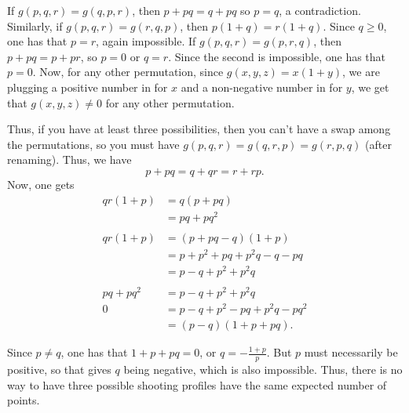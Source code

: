 \documentclass[11pt]{article}
\theoremstyle{definition}
\begin{document}
If $g(p, q, r) = g(q, p, r)$, then $p + pq = q + pq$ so $p = q$, a contradiction.  Similarly, if $g(p, q, r) = g(r, q, p)$, then $p(1+q) = r(1+q)$.  Since $q \geq 0$, one has that $p = r$, again impossible.  If $g(p, q, r) = g(p, r, q)$, then $p + pq = p + pr$, so $p = 0$ or $q=r$.  Since the second is impossible, one has that $p = 0$.  Now, for any other permutation, since $g(x, y, z) = x(1+y)$, we are plugging a positive number in for $x$ and a non-negative number in for $y$, we get that $g(x, y, z) \neq 0$ for any other permutation.

Thus, if you have at least three possibilities, then you can't have a swap among the permutations, so you must have $g(p, q, r) = g(q, r, p) = g(r, p, q)$ (after renaming).  Thus, we have $$p + pq = q+ qr = r + rp.$$  Now, one gets
\begin{align*}
qr(1+p) & = q(p+pq) \\
& = pq + pq^2 \\
& \\
qr(1+p) & = (p + pq - q)(1+p) \\
& = p + p^2 + pq + p^2q - q -pq \\
& = p - q + p^2 + p^2q \\
& \\
pq + pq^2 & = p - q + p^2 + p^2 q \\
0 & = p-q + p^2 - pq + p^2q-pq^2 \\
& = (p-q)(1 + p + pq).
\end{align*}

Since $p \neq q$, one has that $1+p + pq = 0$, or $q = -\frac{1+p}{p}$.  But $p$ must necessarily be positive, so that gives $q$ being negative, which is also impossible.  Thus, there is no way to have three possible shooting profiles have the same expected number of points.
\end{document}
